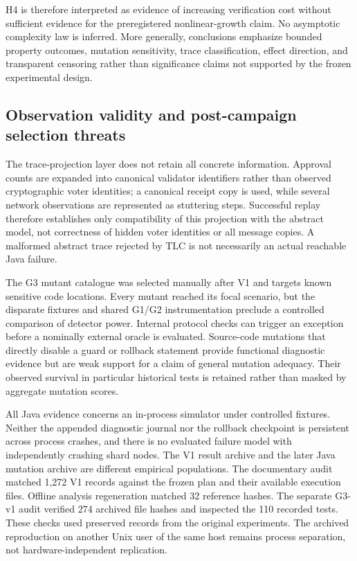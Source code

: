 H4 is therefore interpreted as evidence of increasing verification cost
without sufficient evidence for the preregistered nonlinear-growth claim. No
asymptotic complexity law is inferred. More generally, conclusions emphasize
bounded property outcomes, mutation sensitivity, trace classification, effect
direction, and transparent censoring rather than significance claims not
supported by the frozen experimental design.

\subsection{Observation validity and post-campaign selection threats}
\label{subsec:observation-validity}

The trace-projection layer does not retain all concrete information. Approval
counts are expanded into canonical validator identifiers rather than observed
cryptographic voter identities; a canonical receipt copy is used, while
several network observations are represented as stuttering steps. Successful
replay therefore establishes only compatibility of this projection with the
abstract model, not correctness of hidden voter identities or all message
copies. A malformed abstract trace rejected by TLC is not necessarily an
actual reachable Java failure.

The G3 mutant catalogue was selected manually after V1 and targets known
sensitive code locations. Every mutant reached its focal scenario, but the
disparate fixtures and shared G1/G2 instrumentation preclude a controlled
comparison of detector power. Internal protocol checks can trigger an
exception before a nominally external oracle is evaluated. Source-code
mutations that directly disable a guard or rollback statement provide
functional diagnostic evidence but are weak support for a claim of general
mutation adequacy. Their observed survival in particular historical tests
is retained rather than masked by aggregate mutation scores.

All Java evidence concerns an in-process simulator under controlled fixtures.
Neither the appended diagnostic journal nor the rollback checkpoint is
persistent across process crashes, and there is no evaluated failure model
with independently crashing shard nodes. The V1 result archive and the
later Java mutation archive are different empirical populations. The
documentary audit matched 1,272 V1 records against the frozen plan and
their available execution files. Offline analysis regeneration matched
32 reference hashes. The separate G3-v1 audit verified 274 archived
file hashes and inspected the 110 recorded tests. These checks used
preserved records from the original experiments.
The archived reproduction on another Unix user of the same host remains
process separation, not hardware-independent replication.
